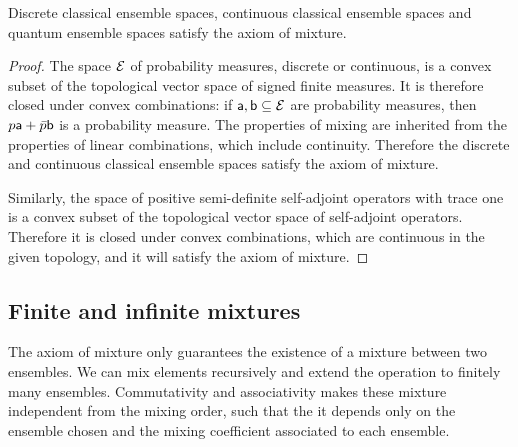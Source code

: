 \begin{mathSection}
\begin{prop}
	Discrete classical ensemble spaces, continuous classical ensemble spaces and quantum ensemble spaces satisfy the axiom of mixture.
\end{prop}

\begin{proof}
	The space $\Ens$ of probability measures, discrete or continuous, is a convex subset of the topological vector space of signed finite measures. It is therefore closed under convex combinations: if $\ens[a], \ens[b] \subseteq \Ens$ are probability measures, then $p \ens[a] + \bar{p} \ens[b]$ is a probability measure. The properties of mixing are inherited from the properties of linear combinations, which include continuity. Therefore the discrete and continuous classical ensemble spaces satisfy the axiom of mixture.
	
	Similarly, the space of positive semi-definite self-adjoint operators with trace one is a convex subset of the topological vector space of self-adjoint operators. Therefore it is closed under convex combinations, which are continuous in the given topology, and it will satisfy the axiom of mixture.
\end{proof}
\end{mathSection}

\subsection{Finite and infinite mixtures}

The axiom of mixture only guarantees the existence of a mixture between two ensembles. We can mix elements recursively and extend the operation to finitely many ensembles. Commutativity and associativity makes these mixture independent from the mixing order, such that the it depends only on the ensemble chosen and the mixing coefficient associated to each ensemble.

